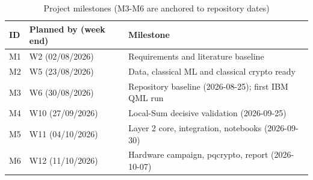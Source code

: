 \begin{table}[ht]\centering\small\caption{Project milestones (M3-M6 are anchored to repository dates)}\label{tab:milestones}
\begin{tabular}{@{}p{1.0cm}p{3.6cm}p{8.4cm}@{}}\toprule ID & Planned by (week end) & Milestone\\ \midrule
M1 & W2 (02/08/2026) & Requirements and literature baseline\\
M2 & W5 (23/08/2026) & Data, classical ML and classical crypto ready\\
M3 & W6 (30/08/2026) & Repository baseline (2026-08-25); first IBM QML run\\
M4 & W10 (27/09/2026) & Local-Sum decisive validation (2026-09-25)\\
M5 & W11 (04/10/2026) & Layer 2 core, integration, notebooks (2026-09-30)\\
M6 & W12 (11/10/2026) & Hardware campaign, pqcrypto, report (2026-10-07)\\
\bottomrule\end{tabular}\end{table}
